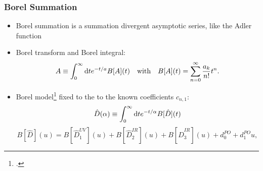 \documentclass{beamer}
\begin{document}
\begin{frame}
  \frametitle{Borel Summation}
  \begin{itemize}
  \item Borel summation is a summation divergent asymptotic series, like the
    Adler function
  \item Borel transform and Borel integral:
    \begin{equation}
      A \equiv \int_0^\infty \dif t e^{-t/a} B[A](t) \quad \text{with} \quad B[A](t) = \sum_{n=0}^\infty \frac{a_k}{n!} t^n.
    \end{equation}
  \item Borel model\footcite{Beneke2008} fixed to the to the known coefficients
    \(c_{n,1}\):
    \begin{equation}
      \hat D(\alpha) \equiv \int_0^\infty \dif t e^{-t/\alpha} B[\hat D](t)
    \end{equation}
    \begin{equation}
      \label{eq:borelModel}
      B[\widehat D](u) = B[\widehat D_1^{UV}](u) + B[\widehat D_2^{IR}](u) + B[\widehat D_3^{IR}](u) + d_0^{PO} + d_1^{PO}u,
    \end{equation}
  \end{itemize}
\end{frame}
\end{document}
